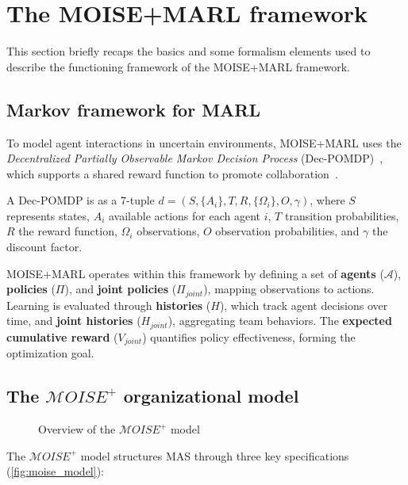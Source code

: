 \documentclass[pdflatex,sn-mathphys-num]{sn-jnl}%
\theoremstyle{thmstyleone}%
\theoremstyle{thmstyletwo}%
\theoremstyle{thmstylethree}%
\begin{document}
\clearpage

\section{The MOISE+MARL framework}\label{sec:moise_marl}

This section briefly recaps the basics and some formalism elements used to describe the functioning framework of the MOISE+MARL framework.

\subsection{Markov framework for MARL}

To model agent interactions in uncertain environments, MOISE+MARL uses the \textit{Decentralized Partially Observable Markov Decision Process} (Dec-POMDP)~\citep{Oliehoek2016}, which supports a shared reward function to promote collaboration~\citep{Beynier2013}. 

A Dec-POMDP is as a 7-tuple $d = (S, \{A_i\}, T, R, \{\Omega_i\}, O, \gamma)$, where $S$ represents states, $A_i$ available actions for each agent $i$, $T$ transition probabilities, $R$ the reward function, $\Omega_i$ observations, $O$ observation probabilities, and $\gamma$ the discount factor. 

MOISE+MARL operates within this framework by defining a set of \textbf{agents} ($\mathcal{A}$), \textbf{policies} ($\Pi$), and \textbf{joint policies} ($\Pi_{joint}$), mapping observations to actions. Learning is evaluated through \textbf{histories} ($H$), which track agent decisions over time, and \textbf{joint histories} ($H_{joint}$), aggregating team behaviors. The \textbf{expected cumulative reward} ($V_{joint}$) quantifies policy effectiveness, forming the optimization goal.

\subsection{The $\mathcal{M}OISE^+$ organizational model}

\begin{figure}[h!]
    \centering
    
    \caption{Overview of the $\mathcal{M}OISE^+$ model}
    \label{fig:moise_model}
\end{figure}

The $\mathcal{M}OISE^+$ model structures MAS through three key specifications (\autoref{fig:moise_model}): 
\end{document}

